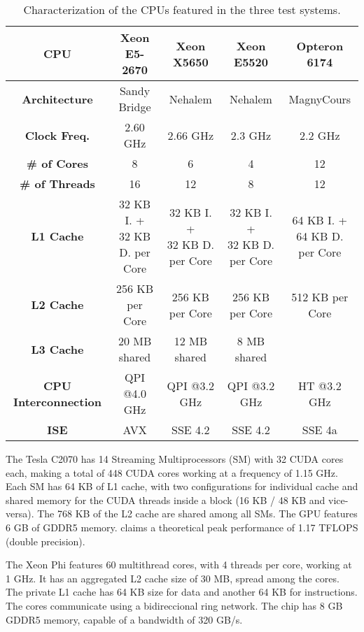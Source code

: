\begin{table}[!htp]
	\begin{center}
		\begin{tabular}{|c|c|c|c|c|}
			\hline
			\textbf{CPU} & \intel Xeon E5-2670 & \intel Xeon X5650 & \intel Xeon E5520 & \amd Opteron 6174 \\ \hline
			\textbf{Architecture} & Sandy Bridge & Nehalem & Nehalem & Magny\-Cours \\ \hline
			\textbf{Clock Freq.} & 2.60 GHz & 2.66 GHz & 2.3 GHz & 2.2 GHz \\ \hline
			\textbf{\# of Cores} & 8 & 6 & 4 & 12 \\ \hline
			\textbf{\# of Threads} & 16 & 12 & 8 & 12 \\ \hline
			\textbf{L1 Cache} & \specialcell{32 KB I. +\\32 KB D. per Core} & \specialcell{32 KB I. +\\32 KB D. per Core} & \specialcell{32 KB I. +\\32 KB D. per Core} & \specialcell{64 KB I. +\\64 KB D. per Core} \\ \hline
			\textbf{L2 Cache} & 256 KB per Core & 256 KB per Core & 256 KB per Core & 512 KB per Core \\ \hline
			\textbf{L3 Cache} & 20 MB shared & 12 MB shared & 8 MB shared & \- \\ \hline
			\textbf{CPU Interconnection} & QPI @4.0 GHz & QPI @3.2 GHz & QPI @3.2 GHz & HT @3.2 GHz \\ \hline
			\textbf{ISE} & AVX & SSE 4.2 & SSE 4.2 & SSE 4a \\
			\hline
		\end{tabular}
		\caption{Characterization of the CPUs featured in the three test systems.}
		\label{tab:CPUS}
	\end{center}
\end{table}

The \nvidia Tesla C2070 has 14 Streaming Multiprocessors (SM) with 32 CUDA cores each, making a total of 448 CUDA cores working at a frequency of 1.15 GHz. Each SM has 64 KB of L1 cache, with two configurations for individual cache and shared memory for the CUDA threads inside a block (16 KB / 48 KB and vice-versa). The 768 KB of the L2 cache are shared among all SMs. The GPU features 6 GB of GDDR5 memory. \nvidia claims a theoretical peak performance of 1.17 TFLOPS (double precision).

The \intel Xeon Phi features 60 multithread cores, with 4 threads per core, working at 1 GHz. It has an aggregated L2 cache size of 30 MB, spread among the cores. The private L1 cache has 64 KB size for data and another 64 KB for instructions. The cores communicate using a bidireccional ring network. The chip has 8 GB GDDR5 memory, capable of a bandwidth of 320 GB/s.

